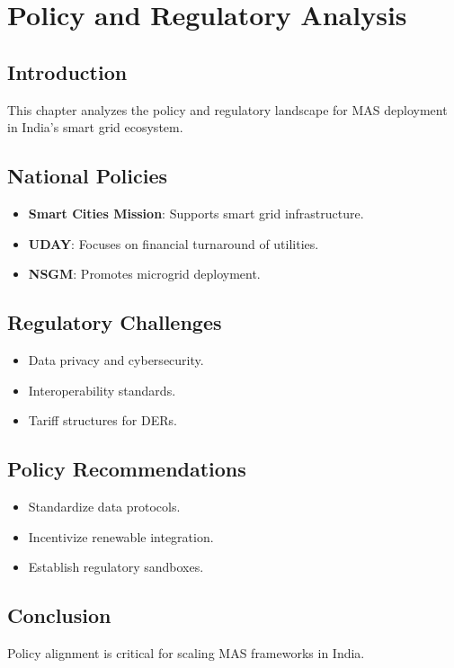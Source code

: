 \documentclass[12pt, a4paper, oneside]{book}
\begin{document}
\chapter{Policy and Regulatory Analysis}
\section{Introduction}
This chapter analyzes the policy and regulatory landscape for MAS deployment in India’s smart grid ecosystem.

\section{National Policies}
\begin{itemize}
    \item \textbf{Smart Cities Mission}: Supports smart grid infrastructure.
    \item \textbf{UDAY}: Focuses on financial turnaround of utilities.
    \item \textbf{NSGM}: Promotes microgrid deployment.
\end{itemize}

\section{Regulatory Challenges}
\begin{itemize}
    \item Data privacy and cybersecurity.
    \item Interoperability standards.
    \item Tariff structures for DERs.
\end{itemize}

\section{Policy Recommendations}
\begin{itemize}
    \item Standardize data protocols.
    \item Incentivize renewable integration.
    \item Establish regulatory sandboxes.
\end{itemize}

\section{Conclusion}
Policy alignment is critical for scaling MAS frameworks in India.
\end{document}
